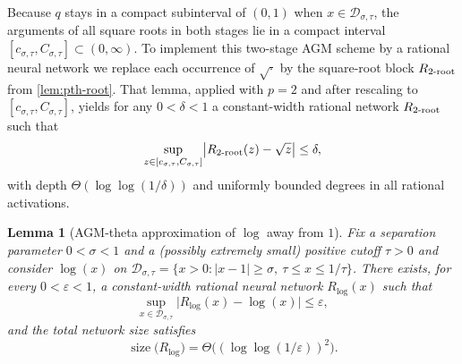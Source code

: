 \documentclass{article}
\theoremstyle{plain}
\newtheorem{lemma}[theorem]{Lemma}
\theoremstyle{definition}
\theoremstyle{remark}
\begin{document}
Because $q$ stays in a compact subinterval of $(0,1)$ when $x\in\mathcal D_{\sigma,\tau}$, the arguments of all square roots in both stages lie in a compact interval $[c_{\sigma,\tau},C_{\sigma,\tau}]\subset(0,\infty)$. To implement this two-stage AGM scheme by a rational neural network we replace each occurrence of $\sqrt{\cdot}$ by the square-root block $R_{2\textnormal{-root}}$ from \cref{lem:pth-root}. That lemma, applied with $p=2$ and after rescaling to $[c_{\sigma,\tau},C_{\sigma,\tau}]$, yields for any $0<\delta<1$ a constant-width rational network $R_{2\textnormal{-root}}$ such that
\[
\sup_{z\in[c_{\sigma,\tau},C_{\sigma,\tau}]}
\bigl|R_{2\textnormal{-root}}(z)-\sqrt{z}\bigr|\le\delta,
\]
with depth $\Theta(\log\log(1/\delta))$ and uniformly bounded degrees in all rational activations.

\begin{lemma}[AGM-theta approximation of $\log$ away from $1$]
\label{lem:log-agm-theta}
Fix a separation parameter $0<\sigma<1$ and a (possibly extremely small) positive cutoff $\tau>0$ and consider $\log(x)$ on $\mathcal D_{\sigma,\tau}=\{x>0:|x-1|\ge\sigma,\ \tau\le x\le 1/\tau\}$. There exists, for every $0<\varepsilon<1$, a constant-width rational neural network $R_{\log}(x)$ such that
\[
\sup_{x\in\mathcal D_{\sigma,\tau}}
\bigl|R_{\log}(x)-\log(x)\bigr|
\le\varepsilon,
\]
and the total network size satisfies
\[
\operatorname{size}\bigl(R_{\log}\bigr)
=
\Theta\bigl((\log\log(1/\varepsilon))^2\bigr).
\]
\end{lemma}
\end{document}
